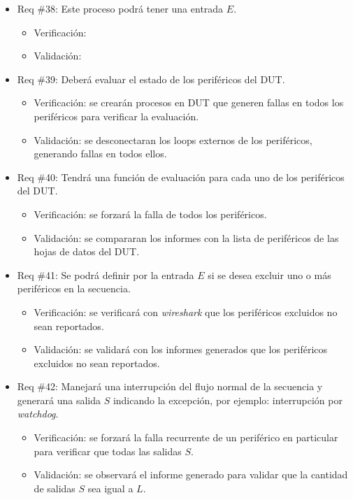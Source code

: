 \documentclass[
11pt, %
]{charter}
\begin{document}
\begin{itemize}
\item Req \#38: Este proceso podrá tener una entrada $ E $.
\begin{itemize}
    \item Verificación:
    \item Validación:
\end{itemize}

\item Req \#39: Deberá evaluar el estado de los periféricos del DUT.
\begin{itemize}
    \item Verificación: se crearán procesos en DUT que generen fallas en todos los periféricos para verificar la evaluación.
    \item Validación: se desconectaran los loops externos de los periféricos, generando fallas en todos ellos.
\end{itemize}

\item Req \#40: Tendrá una función de evaluación para cada uno de los periféricos del DUT.
\begin{itemize}
    \item Verificación: se forzará la falla de todos los periféricos.
    \item Validación: se compararan los informes con la lista de periféricos de las hojas de datos del DUT.
\end{itemize}

\item Req \#41: Se podrá definir por la entrada $ E $ si se desea excluir uno o más periféricos en la secuencia.
\begin{itemize}
    \item Verificación: se verificará con \emph{wireshark} que los periféricos excluidos no sean reportados.
    \item Validación: se validará con los informes generados que los periféricos excluidos no sean reportados.
\end{itemize}

\item Req \#42: Manejará una interrupción del flujo normal de la secuencia y generará una salida $ S $ indicando la excepción, por ejemplo: interrupción por \emph{watchdog}.
\begin{itemize}
    \item Verificación: se forzará la falla recurrente de un periférico en particular para verificar que todas las salidas $ S $.
    \item Validación: se observará el informe generado para validar que la cantidad de salidas $ S $ sea igual a $ L $.
\end{itemize}


\end{itemize}
\end{document}
